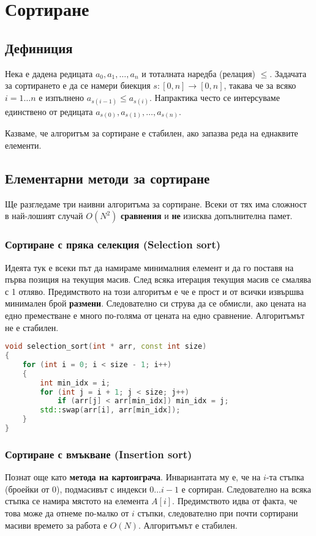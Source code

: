 \documentclass[fleqn,12pt]{article}
\begin{document}
\section{Сортиране}
\subsection{Дефиниция}
Нека е дадена редицата $a_0, a_1, \dots, a_n$ и тоталната наредба (релация) $\leq$.
Задачата за сортирането е да се намери биекция $s : [0, n] \rightarrow [0, n]$, такава че 
за всяко $i = 1 \dots n$ е изпълнено $a_{s(i - 1)} \leq a_{s(i)}$.
Напрактика често се интерсуваме единствено от редицата $a_{s(0)}, a_{s(1)}, \dots, a_{s(n)}$.

Казваме, че алгоритъм за сортиране е стабилен, ако запазва реда на еднаквите елементи.

\subsection{Елементарни методи за сортиране}
Ще разгледаме три наивни алгоритъма за сортиране. Всеки от тях има сложност в най-лошият случай $O(N^2)$ \textbf{сравнения} 
и \textbf{не} изисква допълнителна памет.

\subsubsection{Сортиране с пряка селекция (Selection sort)}
Идеята тук е всеки път да намираме минималния елемент и да го поставя на първа позиция на текущия масив.
След всяка итерация текущия масив се смалява с 1 отляво. Предимството на този алгоритъм е че е прост и от всички
извършва минимален брой \textbf{размени}. Следователно си струва да се обмисли, ако цената на едно преместване е
много по-голяма от цената на едно сравнение. Алгоритъмът не е стабилен.

\begin{lstlisting}[language=C++, caption=Selection sort]
void selection_sort(int * arr, const int size)
{
    for (int i = 0; i < size - 1; i++)
    {
        int min_idx = i;
        for (int j = i + 1; j < size; j++) 
            if (arr[j] < arr[min_idx]) min_idx = j;
        std::swap(arr[i], arr[min_idx]);
    }
}
\end{lstlisting}

\subsubsection{Сортиране с вмъкване (Insertion sort)}
\label{sort:insertion}
Познат още като \textbf{метода на картоиграча}. Инвариантата му е, че на $i$-та стъпка (броейки от 0), подмасивът 
с индекси $0 \dots i - 1$ е сортиран. Следователно на всяка стъпка се намира мястото на елемента $A[i]$. 
Предимството идва от факта, че това може да отнеме по-малко от $i$ стъпки, следователно при почти сортирани масиви
времето за работа е $O(N)$. Алгоритъмът е стабилен.
\end{document}
